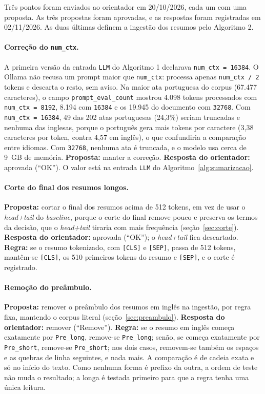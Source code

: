 \documentclass[12pt]{article}
\begin{document}
Três pontos foram enviados ao orientador em 20/10/2026, cada um com uma
proposta. As três propostas foram aprovadas, e as respostas foram registradas em
02/11/2026. As duas últimas definem a ingestão dos resumos pelo Algoritmo 2.

\paragraph{Correção do \texttt{num\_ctx}.}\label{sec:num_ctx} A primeira versão
da entrada \texttt{LLM} do Algoritmo 1 declarava \texttt{num\_ctx = 16384}. O
Ollama não recusa um prompt maior que \texttt{num\_ctx}: processa apenas
\texttt{num\_ctx / 2} tokens e descarta o resto, sem aviso. Na maior ata
portuguesa do corpus (67.477 caracteres), o campo \texttt{prompt\_eval\_count}
mostrou 4.098 tokens processados com \texttt{num\_ctx = 8192}, 8.194 com
\texttt{16384} e os 19.945 do documento com \texttt{32768}. Com
\texttt{num\_ctx = 16384}, 49 das 202 atas portuguesas (24,3\%) seriam
truncadas e nenhuma das inglesas, porque o português gera mais tokens por
caractere (3,38 caracteres por token, contra 4,57 em inglês), o que confundiria
a comparação entre idiomas. Com \texttt{32768}, nenhuma ata é truncada, e o
modelo usa cerca de 9~GB de memória. \textbf{Proposta:} manter a correção.
\textbf{Resposta do orientador:} aprovada (``OK''). O valor está na entrada
\texttt{LLM} do Algoritmo~\ref{alg:sumarizacao}.

\paragraph{Corte do final dos resumos longos.} \textbf{Proposta:} cortar o
final dos resumos acima de 512 tokens, em vez de usar o \textit{head+tail} do
\textit{baseline}, porque o corte do final remove pouco e preserva os termos da
decisão, que o \textit{head+tail} tiraria com mais frequência
(seção~\ref{sec:corte}). \textbf{Resposta do orientador:} aprovada (``OK''); o
\textit{head+tail} fica descartado. \textbf{Regra:} se o resumo tokenizado, com
\texttt{[CLS]} e \texttt{[SEP]}, passa de 512 tokens, mantêm-se \texttt{[CLS]},
os 510 primeiros tokens do resumo e \texttt{[SEP]}, e o corte é registrado.

\paragraph{Remoção do preâmbulo.} \textbf{Proposta:} remover o preâmbulo dos
resumos em inglês na ingestão, por regra fixa, mantendo o corpus literal
(seção~\ref{sec:preambulo}). \textbf{Resposta do orientador:} remover
(``Remove''). \textbf{Regra:} se o resumo em inglês começa exatamente por
\texttt{Pre\_long}, remove-se \texttt{Pre\_long}; senão, se começa exatamente
por \texttt{Pre\_short}, remove-se \texttt{Pre\_short}; nos dois casos,
removem-se também os espaços e as quebras de linha seguintes, e nada mais. A
comparação é de cadeia exata e só no início do texto. Como nenhuma forma é
prefixo da outra, a ordem de teste não muda o resultado; a longa é testada
primeiro para que a regra tenha uma única leitura.
\end{document}
